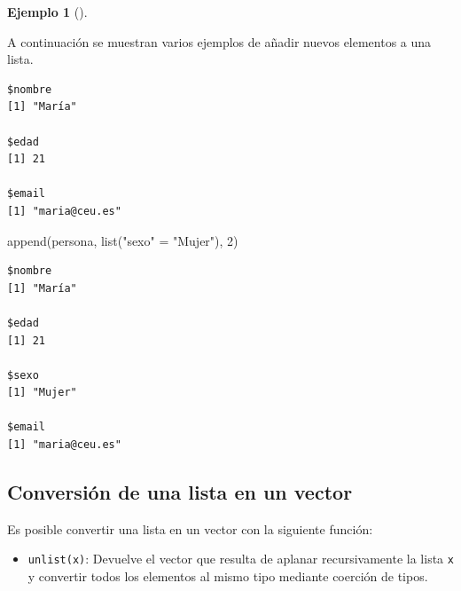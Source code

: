 \documentclass[
  a4paper,
]{scrreport}
\newenvironment{Shaded}{\begin{snugshade}}{\end{snugshade}}
\newcommand{\DecValTok}[1]{\textcolor[rgb]{0.68,0.00,0.00}{#1}}
\newcommand{\FunctionTok}[1]{\textcolor[rgb]{0.28,0.35,0.67}{#1}}
\newcommand{\NormalTok}[1]{\textcolor[rgb]{0.00,0.23,0.31}{#1}}
\newcommand{\OtherTok}[1]{\textcolor[rgb]{0.00,0.23,0.31}{#1}}
\newcommand{\SpecialCharTok}[1]{\textcolor[rgb]{0.37,0.37,0.37}{#1}}
\newcommand{\StringTok}[1]{\textcolor[rgb]{0.13,0.47,0.30}{#1}}
\providecommand{\tightlist}{%
  \setlength{\itemsep}{0pt}\setlength{\parskip}{0pt}}\usepackage{longtable,booktabs,array}
\theoremstyle{definition}
\theoremstyle{definition}
\newtheorem{example}{Ejemplo}[chapter]
\theoremstyle{remark}
\begin{document}
\leavevmode{}%
\begin{example}[]\label{exm-añadir-elementos-listas}

A continuación se muestran varios ejemplos de añadir nuevos elementos a
una lista.

\begin{Shaded}
\end{Shaded}

\begin{verbatim}
$nombre
[1] "María"

$edad
[1] 21

$email
[1] "maria@ceu.es"
\end{verbatim}

\begin{Shaded}
\begin{Highlighting}[]
\FunctionTok{append}\NormalTok{(persona, }\FunctionTok{list}\NormalTok{(}\StringTok{"sexo"} \OtherTok{=} \StringTok{"Mujer"}\NormalTok{), }\DecValTok{2}\NormalTok{)}
\end{Highlighting}
\end{Shaded}

\begin{verbatim}
$nombre
[1] "María"

$edad
[1] 21

$sexo
[1] "Mujer"

$email
[1] "maria@ceu.es"
\end{verbatim}

\end{example}

\hypertarget{conversiuxf3n-de-una-lista-en-un-vector}{%
\subsection{Conversión de una lista en un
vector}\label{conversiuxf3n-de-una-lista-en-un-vector}}

Es posible convertir una lista en un vector con la siguiente función:

\begin{itemize}
\tightlist
\item
  \texttt{unlist(x)}: Devuelve el vector que resulta de aplanar
  recursivamente la lista \texttt{x} y convertir todos los elementos al
  mismo tipo mediante coerción de tipos.
\end{itemize}
\end{document}
